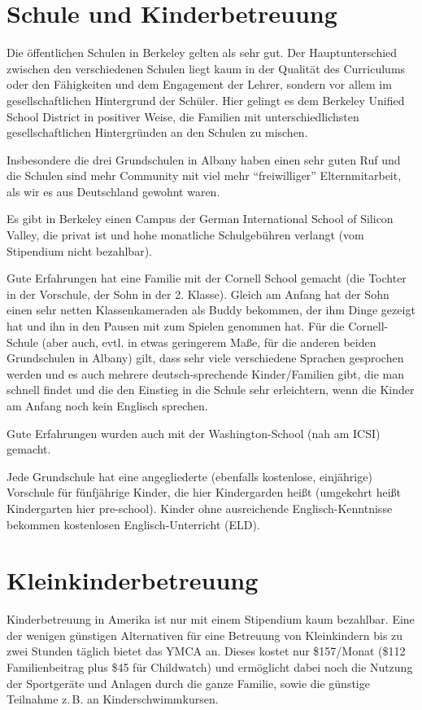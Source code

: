 \documentclass[a4paper]{scrreprt}
\begin{document}
\section{Schule und Kinderbetreuung}

Die öffentlichen Schulen in Berkeley gelten als sehr gut. Der Hauptunterschied zwischen den verschiedenen Schulen liegt kaum in der Qualität des Curriculums oder den Fähigkeiten und dem Engagement der Lehrer, sondern vor allem im gesellschaftlichen Hintergrund der Schüler. Hier gelingt es dem Berkeley Unified School District in positiver Weise, die Familien mit unterschiedlichsten gesellschaftlichen Hintergründen an den Schulen zu mischen.

Insbesondere die drei Grundschulen in Albany haben einen sehr guten Ruf und die Schulen sind mehr Community mit viel mehr "`freiwilliger"' Elternmitarbeit, als wir es aus Deutschland gewohnt waren.

Es gibt in Berkeley einen Campus der German International School of Silicon Valley, die privat ist und hohe monatliche Schulgebühren verlangt (vom Stipendium nicht bezahlbar).

Gute Erfahrungen hat eine Familie mit der Cornell School gemacht (die Tochter in der Vorschule, der Sohn in der 2. Klasse). Gleich am Anfang hat der Sohn einen sehr netten Klassenkameraden als Buddy bekommen, der ihm Dinge gezeigt hat und ihn in den Pausen mit zum Spielen genommen hat. Für die Cornell-Schule (aber auch, evtl. in etwas geringerem Maße, für die anderen beiden Grundschulen in Albany) gilt, dass sehr viele verschiedene Sprachen gesprochen werden und es auch mehrere deutsch-sprechende Kinder/Familien gibt, die man schnell findet und die den Einstieg in die Schule sehr erleichtern, wenn die Kinder am Anfang noch kein Englisch sprechen.

Gute Erfahrungen wurden auch mit der Washington-School (nah am ICSI) gemacht.

Jede Grundschule hat eine angegliederte (ebenfalls kostenlose, einjährige) Vorschule für fünfjährige Kinder, die hier Kindergarden heißt (umgekehrt heißt Kindergarten hier pre-school). Kinder ohne ausreichende Englisch-Kenntnisse bekommen kostenlosen Englisch-Unterricht (ELD).

\section{Kleinkinderbetreuung}

Kinderbetreuung in Amerika ist nur mit einem Stipendium kaum bezahlbar. Eine der wenigen günstigen Alternativen für eine Betreuung von Kleinkindern bis zu zwei Stunden täglich bietet das YMCA an. Dieses kostet nur \$157/Monat (\$112 Familienbeitrag plus \$45 für Childwatch) und ermöglicht dabei noch die Nutzung der Sportgeräte und Anlagen durch die ganze Familie, sowie die günstige Teilnahme z.\,B. an Kinderschwimmkursen.
\end{document}
